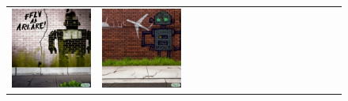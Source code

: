 \begin{figure}
\begin{adjustwidth}{-0.8in}{-0.5in}
\begin{tabular}{cccccccccccccccccccc}
\multicolumn{3}{c}{\includegraphics[width=\twobytwocolwidth\textwidth]{figures/limitations/robot_airplane1.jpg}} &
\multicolumn{3}{c}{\includegraphics[width=\twobytwocolwidth\textwidth]{figures/limitations/robot_airplane2.jpg}} &&

\end{tabular}
\end{adjustwidth}
\end{figure}
